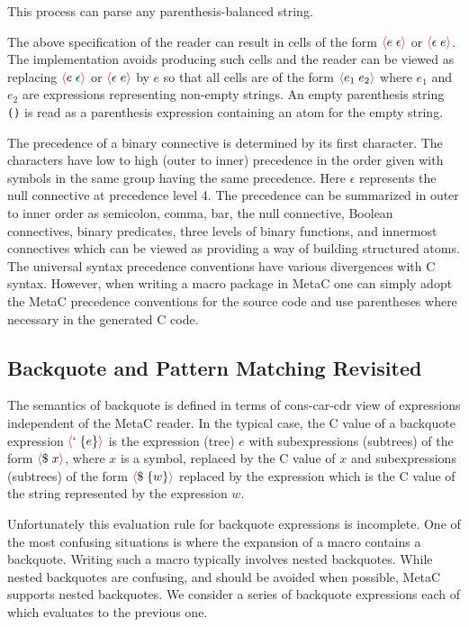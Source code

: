 \documentclass{article}
\newcommand{\fopen}{{\color{red} \langle}}
\newcommand{\fclose}{{\color{red} \rangle}}
\begin{document}
\noindent This process can parse any parenthesis-balanced string.

The above specification of the reader can result in cells of the form $\fopen e\;\epsilon \fclose$ or $\fopen \epsilon \;e\fclose$.   The implementation avoids producing such cells
and the reader can be viewed as replacing $\fopen e\;\epsilon \fclose$ or $\fopen \epsilon \;e\fclose$ by $e$ so that
all cells are of the form $\fopen e_1\;e_2\fclose$ where $e_1$ and $e_2$ are expressions representing non-empty strings.  An empty parenthesis string {\tt ()}
is read as a parenthesis expression containing an atom for the empty string.


\noindent The precedence of a binary connective is determined by its first character.  The
characters have low to high (outer to inner) precedence in the order given with symbols in the same
group having the same precedence.  Here $\epsilon$ represents the null connective at precedence
level 4.  The precedence can be summarized in outer to inner order as semicolon, comma, bar, the
null connective, Boolean connectives, binary predicates, three levels of binary functions, and
innermost connectives which can be viewed as providing a way of building structured atoms.  The
universal syntax precedence conventions have
various divergences with C syntax.  However, when writing a macro package in MetaC one can simply
adopt the MetaC precedence conventions for the source code and use parentheses where necessary in
the generated C code.

\subsection{Backquote and Pattern Matching Revisited}

The semantics of backquote is defined in terms of cons-car-cdr view of expressions independent of the MetaC reader.
In the typical case, the C value of a backquote expression
$\fopen ` \;\{e\}\fclose$ is the expression (tree) $e$ with subexpressions (subtrees) of the form $\fopen \$\;x \fclose$, where $x$ is a symbol,
replaced by the C value of $x$
and subexpressions (subtrees) of the form $\fopen \$\;\{w\}\fclose$ replaced by the expression which is the C value of the string represented by the expression $w$.

Unfortunately this evaluation rule for backquote expressions is incomplete.  One of the most
confusing situations is where the expansion of a macro contains a backquote.  Writing such a macro typically involves nested backquotes.  While nested backquotes
are confusing, and should be avoided when possible, MetaC supports nested backquotes.  We consider a series of backquote expressions each of which evaluates to the previous one.
\end{document}
